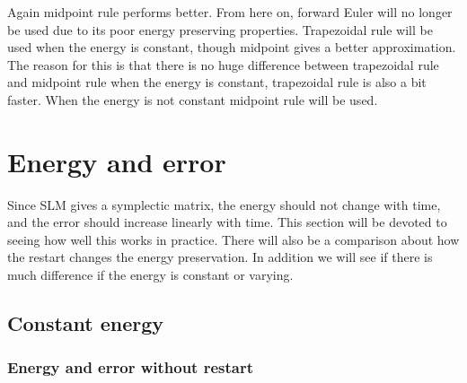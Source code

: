 Again midpoint rule performs better. From here on, forward Euler will no longer be used due to its poor energy preserving properties. Trapezoidal rule will be used when the energy is constant, though midpoint gives a better approximation. The reason for this is that there is no huge difference between trapezoidal rule and midpoint rule when the energy is constant, trapezoidal rule is also a bit faster. When the energy is not constant midpoint rule will be used. 



\section{Energy and error }%

Since SLM gives a symplectic matrix, the energy should not change with time, and the error should increase linearly with time. This section will be devoted to seeing how well this works in practice. There will also be a comparison about how the restart changes the energy preservation. In addition we will see if there is much difference if the energy is constant or varying.

\subsection{Constant energy} %

\subsubsection{Energy and error without restart} %

